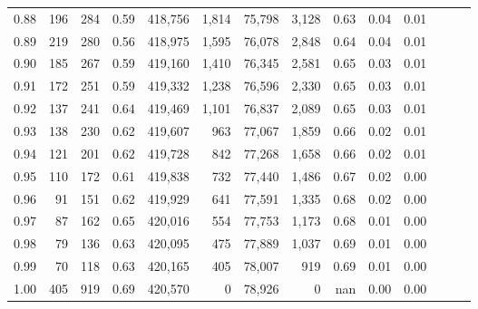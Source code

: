 \begin{tabular}{rrrrrrrrrrrrrr}
0.88 &     196 &    284 &  0.59 &  418,756 &    1,814 &  75,798 &   3,128 &  0.63 &  0.04 &      0.01 \\
0.89 &     219 &    280 &  0.56 &  418,975 &    1,595 &  76,078 &   2,848 &  0.64 &  0.04 &      0.01 \\
0.90 &     185 &    267 &  0.59 &  419,160 &    1,410 &  76,345 &   2,581 &  0.65 &  0.03 &      0.01 \\
0.91 &     172 &    251 &  0.59 &  419,332 &    1,238 &  76,596 &   2,330 &  0.65 &  0.03 &      0.01 \\
0.92 &     137 &    241 &  0.64 &  419,469 &    1,101 &  76,837 &   2,089 &  0.65 &  0.03 &      0.01 \\
0.93 &     138 &    230 &  0.62 &  419,607 &      963 &  77,067 &   1,859 &  0.66 &  0.02 &      0.01 \\
0.94 &     121 &    201 &  0.62 &  419,728 &      842 &  77,268 &   1,658 &  0.66 &  0.02 &      0.01 \\
0.95 &     110 &    172 &  0.61 &  419,838 &      732 &  77,440 &   1,486 &  0.67 &  0.02 &      0.00 \\
0.96 &      91 &    151 &  0.62 &  419,929 &      641 &  77,591 &   1,335 &  0.68 &  0.02 &      0.00 \\
0.97 &      87 &    162 &  0.65 &  420,016 &      554 &  77,753 &   1,173 &  0.68 &  0.01 &      0.00 \\
0.98 &      79 &    136 &  0.63 &  420,095 &      475 &  77,889 &   1,037 &  0.69 &  0.01 &      0.00 \\
0.99 &      70 &    118 &  0.63 &  420,165 &      405 &  78,007 &     919 &  0.69 &  0.01 &      0.00 \\
1.00 &     405 &    919 &  0.69 &  420,570 &        0 &  78,926 &       0 &   nan &  0.00 &      0.00 \\
\bottomrule
\end{tabular}
